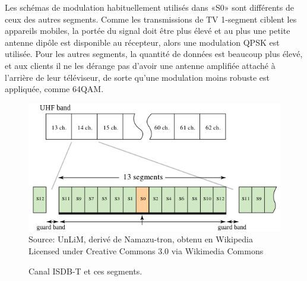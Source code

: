 \documentclass[12pt,a4paper]{article}
\begin{document}
Les schémas de modulation habituellement utilisés dans «S0» sont différents de ceux des autres segments. Comme les transmissions de TV 1-segment ciblent les appareils mobiles, la portée du signal doit être plus élevé et au plus une petite antenne dipôle est disponible au récepteur, alors une modulation QPSK est utilisée. Pour les autres segments, la quantité de données est beaucoup plus élevé, et aux clients il ne les dérange pas d'avoir une antenne amplifiée attaché à l'arrière de leur téléviseur, de sorte qu'une modulation moins robuste est appliquée, comme 64QAM.

\begin{figure}[!h]
\centering
\caption{Canal ISDB-T et ces segments.}
\includegraphics[width=0.8\linewidth]{pictures/ISDB-T_CH_Seg_Prog_allocation.png}
\\ Source: UnLiM, derivé de Namazu-tron, obtenu en Wikipedia \cite{ISDB_wiki}
\\ Licensed under Creative Commons 3.0 via Wikimedia Commons
\label{fig:ISDB-T_CH_Seg_Prog_allocation}
\end{figure}





\newpage
\-\-\-
\newpage
\TBindex
{}
\TBglossary

\TBcoverpage
\end{document}
